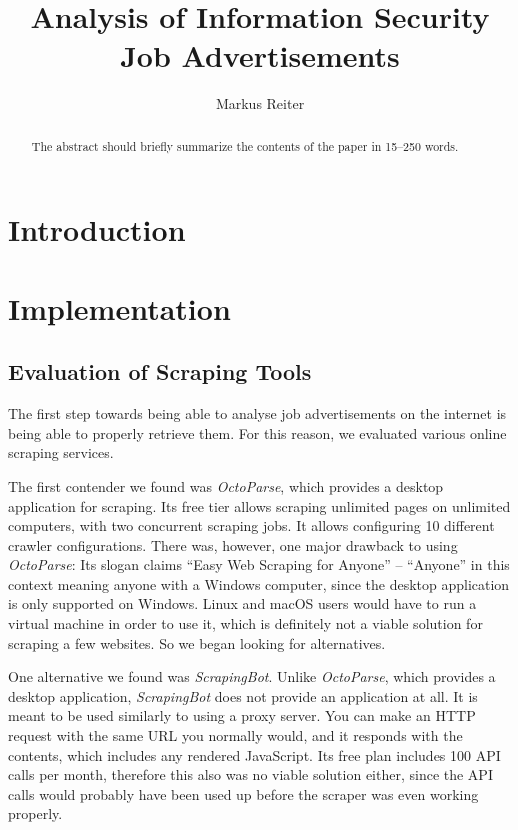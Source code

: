\documentclass[runningheads]{llncs}
\begin{document}
\title{Analysis of Information Security Job Advertisements}

\author{Markus Reiter}


\maketitle

\begin{abstract}
The abstract should briefly summarize the contents of the paper in
15--250 words.


\end{abstract}

\section{Introduction}
\label{sec:introduction}


\section{Implementation}

\subsection{Evaluation of Scraping Tools}
\label{sub:evaluation_of_scraping_tools}

The first step towards being able to analyse job advertisements on the internet is being able to properly retrieve them. For this reason, we evaluated various online scraping services.

The first contender we found was \textit{OctoParse}, which provides a desktop application for scraping. Its free tier allows scraping unlimited pages on unlimited computers, with two concurrent scraping jobs. It allows configuring 10 different crawler configurations. There was, however, one major drawback to using \textit{OctoParse}: Its slogan claims “Easy Web Scraping for Anyone” – “Anyone” in this context meaning anyone with a Windows computer, since the desktop application is only supported on Windows. Linux and macOS users would have to run a virtual machine in order to use it, which is definitely not a viable solution for scraping a few websites. So we began looking for alternatives.

One alternative we found was \textit{ScrapingBot}. Unlike \textit{OctoParse}, which provides a desktop application, \textit{ScrapingBot} does not provide an application at all. It is meant to be used similarly to using a proxy server. You can make an HTTP request with the same URL you normally would, and it responds with the contents, which includes any rendered JavaScript. Its free plan includes 100 API calls per month, therefore this also was no viable solution either, since the API calls would probably have been used up before the scraper was even working properly.
\end{document}
